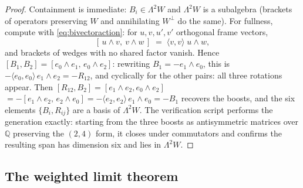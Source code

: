 \documentclass[11pt]{article}
\theoremstyle{definition}
\newcommand{\ip}[2]{\langle #1, #2\rangle}
\begin{document}
\begin{proof}
Containment is immediate: $B_i \in \Lambda^2 W$ and $\Lambda^2 W$ is a subalgebra (brackets of operators preserving $W$ and annihilating $W^\perp$ do the same). For fullness, compute with \eqref{eq:bivectoraction}: for $u,v,u',v'$ orthogonal frame vectors,
\[
[\,u\wedge v,\ v\wedge w\,] \;=\; \ip{v}{v}\; u\wedge w ,
\]
and brackets of wedges with no shared factor vanish. Hence $[B_1, B_2] = [e_0\wedge e_1,\, e_0 \wedge e_2]$: rewriting $B_1 = -e_1\wedge e_0$, this is $-\ip{e_0}{e_0}\, e_1\wedge e_2 = -R_{12}$, and cyclically for the other pairs: all three rotations appear. Then $[R_{12}, B_2] = [e_1\wedge e_2, e_0\wedge e_2]$ $= -[e_1\wedge e_2,\, e_2\wedge e_0] = -\ip{e_2}{e_2}\,e_1\wedge e_0 = -B_1$ recovers the boosts, and the six elements $\{B_i, R_{ij}\}$ are a basis of $\Lambda^2 W$. The verification script performs the generation exactly: starting from the three boosts as antisymmetric matrices over $\mathbb{Q}$ preserving the $(2,4)$ form, it closes under commutators and confirms the resulting span has dimension six and lies in $\Lambda^2 W$.
\end{proof}

\subsection{The weighted limit theorem}\label{subsec:weighted}
\end{document}
